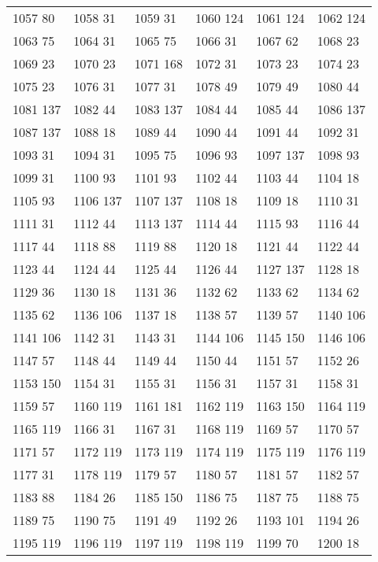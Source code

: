\begin{longtable}{llllll}
1057  80&1058 31&1059 31&1060 124&1061 124&1062 124\\
1063  75&1064 31&1065 75&1066 31&1067 62&1068 23\\
1069  23&1070 23&1071 168&1072 31&1073 23&1074 23\\
1075  23&1076 31&1077 31&1078 49&1079 49&1080 44\\
1081  137&1082 44&1083 137&1084 44&1085 44&1086 137\\
1087  137&1088 18&1089 44&1090 44&1091 44&1092 31\\
1093  31&1094 31&1095 75&1096 93&1097 137&1098 93\\
1099  31&1100 93&1101 93&1102 44&1103 44&1104 18\\
1105  93&1106 137&1107 137&1108 18&1109 18&1110 31\\
1111  31&1112 44&1113 137&1114 44&1115 93&1116 44\\
1117  44&1118 88&1119 88&1120 18&1121 44&1122 44\\
1123  44&1124 44&1125 44&1126 44&1127 137&1128 18\\
1129  36&1130 18&1131 36&1132 62&1133 62&1134 62\\
1135  62&1136 106&1137 18&1138 57&1139 57&1140 106\\
1141  106&1142 31&1143 31&1144 106&1145 150&1146 106\\
1147  57&1148 44&1149 44&1150 44&1151 57&1152 26\\
1153  150&1154 31&1155 31&1156 31&1157 31&1158 31\\
1159  57&1160 119&1161 181&1162 119&1163 150&1164 119\\
1165  119&1166 31&1167 31&1168 119&1169 57&1170 57\\
1171  57&1172 119&1173 119&1174 119&1175 119&1176 119\\
1177  31&1178 119&1179 57&1180 57&1181 57&1182 57\\
1183  88&1184 26&1185 150&1186 75&1187 75&1188 75\\
1189  75&1190 75&1191 49&1192 26&1193 101&1194 26\\
1195  119&1196 119&1197 119&1198 119&1199 70&1200 18\\
\bottomrule\end{longtable}
